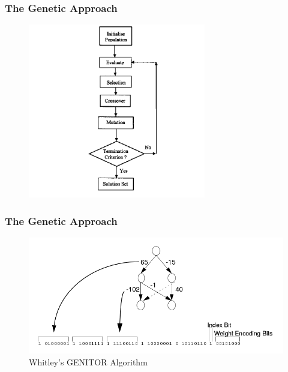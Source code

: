 \documentclass{beamer}
\begin{document}
\begin{frame}
	\frametitle{The Genetic Approach}
	
	\begin{figure}[H]
		\centering
		\includegraphics[height=3in]{imgs/ga_algorithm}
		\label{fig:ga_algorithm}
	\end{figure}	
\end{frame}


\begin{frame}
	\frametitle{The Genetic Approach}
	
	\begin{figure}[H]
		\centering
		\includegraphics[width=\textwidth]{imgs/genitor_encoding}
		\caption{Whitley's GENITOR Algorithm}
		\label{fig:ga_algorithm}
	\end{figure}	
\end{frame}
\end{document}
